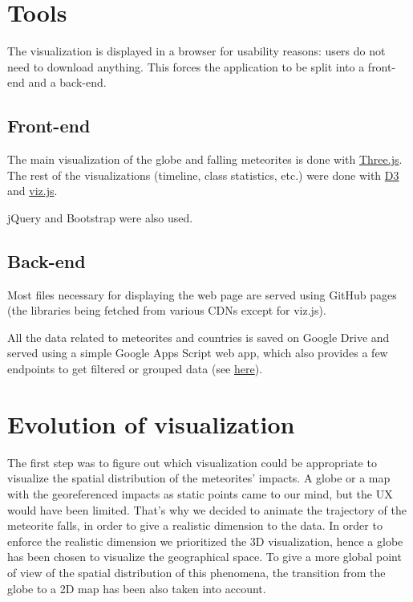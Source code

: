 \documentclass[10pt,conference,compsocconf]{IEEEtran}
\begin{document}
\section{Tools}
\label{sec:tools}

The visualization is displayed in a browser for usability reasons: users do not need to download anything. This forces the application to be split into a front-end and a back-end.

\subsection{Front-end}

The main visualization of the globe and falling meteorites is done with \href{https://threejs.org/}{Three.js}.
The rest of the visualizations (timeline, class statistics, etc.) were done with \href{https://d3js.org/}{D3} and \href{http://vizjs.org/}{viz.js}.

jQuery and Bootstrap were also used.

\subsection{Back-end}

Most files necessary for displaying the web page are served using GitHub pages (the libraries being fetched from various CDNs except for viz.js).

All the data related to meteorites and countries is saved on Google Drive and served using a simple Google Apps Script web app, which also provides a few endpoints to get filtered or grouped data (see \href{https://github.com/RajaSoufi/GeoMeteorites/tree/master/gds-doc#google-drive-server-documentation}{here}).

\newpage
\section{Evolution of visualization}
\label{sec:evolution_of_visualization}

The first step was to figure out which visualization could be appropriate to visualize the spatial distribution of the meteorites' impacts. A globe or a map with the georeferenced impacts as static points came to our mind, but the UX would have been limited. That's why we decided to animate the trajectory of the meteorite falls, in order to give a realistic dimension to the data. In order to enforce the realistic dimension we prioritized the 3D visualization, hence a globe has been chosen to visualize the geographical space. To give a more global point of view of the spatial distribution of this phenomena, the transition from the globe to a 2D map has been also taken into account. 
\end{document}
